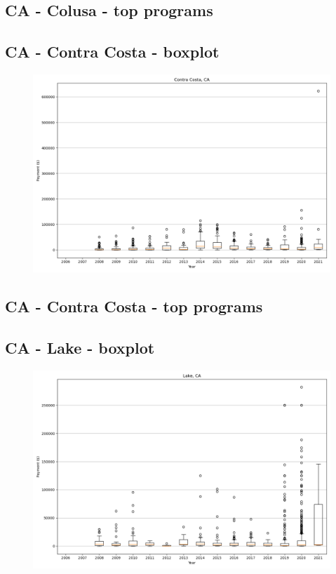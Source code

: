 \subsection*{CA - Colusa - top programs}

\newpage
\subsection*{CA - Contra Costa - boxplot}
\begin{figure}[h]
\centering
\includegraphics[width=7in]{../output/boxplots/counties/Contra Costa-CA_boxplot.png}
\end{figure}


\subsection*{CA - Contra Costa - top programs}

\newpage
\subsection*{CA - Lake - boxplot}
\begin{figure}[h]
\centering
\includegraphics[width=7in]{../output/boxplots/counties/Lake-CA_boxplot.png}
\end{figure}


